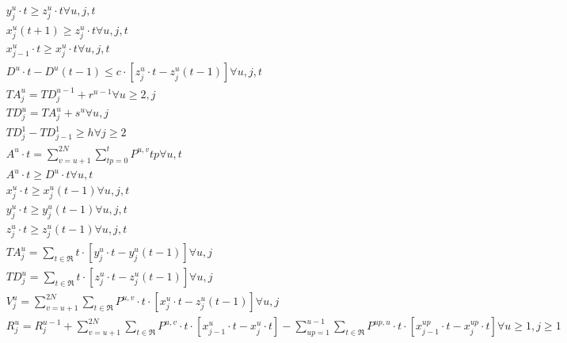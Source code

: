 \begin{align}
  & y_{j}^{u} \cdot t \geq z_{j}^{u} \cdot t \forall u , j , t \tag{eq\_0004} \\
  & x_{j}^{u} \left(t + 1\right) \geq z_{j}^{u} \cdot t \forall u , j , t \tag{eq\_0005} \\
  & x_{j - 1}^{u} \cdot t \geq x_{j}^{u} \cdot t \forall u , j , t \tag{eq\_0006} \\
  & D^{u} \cdot t - D^{u} \left(t - 1\right) \leq c \cdot \left[z_{j}^{u} \cdot t - z_{j}^{u} \left(t - 1\right)\right] \forall u , j , t \tag{eq\_0007} \\
  & \mathit{TA}_{j}^{u} = \mathit{TD}_{j}^{u - 1} + r^{u - 1} \forall u \geq 2 , j \tag{eq\_0010} \\
  & \mathit{TD}_{j}^{u} = \mathit{TA}_{j}^{u} + s^{u} \forall u , j \tag{eq\_0011} \\
  & \mathit{TD}_{j}^{1} - \mathit{TD}_{j - 1}^{1} \geq h \forall j \geq 2 \tag{eq\_0012} \\
  & A^{u} \cdot t = \sum_{v = u + 1}^{2 N} \sum_{tp = 0}^{t} P^{u , v} tp \forall u , t \tag{eq\_0013} \\
  & A^{u} \cdot t \geq D^{u} \cdot t \forall u , t \tag{eq\_0014} \\
  & x_{j}^{u} \cdot t \geq x_{j}^{u} \left(t - 1\right) \forall u , j , t \tag{eq\_0015} \\
  & y_{j}^{u} \cdot t \geq y_{j}^{u} \left(t - 1\right) \forall u , j , t \tag{eq\_0016} \\
  & z_{j}^{u} \cdot t \geq z_{j}^{u} \left(t - 1\right) \forall u , j , t \tag{eq\_0017} \\
  & \mathit{TA}_{j}^{u} = \sum_{t \in \mathfrak{R}} t \cdot \left[y_{j}^{u} \cdot t - y_{j}^{u} \left(t - 1\right)\right] \forall u , j \tag{eq\_0018} \\
  & \mathit{TD}_{j}^{u} = \sum_{t \in \mathfrak{R}} t \cdot \left[z_{j}^{u} \cdot t - z_{j}^{u} \left(t - 1\right)\right] \forall u , j \tag{eq\_0019} \\
  & V_{j}^{u} = \sum_{v = u + 1}^{2 N} \sum_{t \in \mathfrak{R}} P^{u , v} \cdot t \cdot \left[x_{j}^{u} \cdot t - z_{j}^{u} \left(t - 1\right)\right] \forall u , j \tag{eq\_0020} \\
  & R_{j}^{u} = R_{j}^{u - 1} + \sum_{v = u + 1}^{2 N} \sum_{t \in \mathfrak{R}} P^{u , v} \cdot t \cdot \left[x_{j - 1}^{u} \cdot t - x_{j}^{u} \cdot t\right] - \sum_{up = 1}^{u - 1} \sum_{t \in \mathfrak{R}} P^{up , u} \cdot t \cdot \left[x_{j - 1}^{up} \cdot t - x_{j}^{up} \cdot t\right] \forall u \geq 1 , j \geq 1 \tag{eq\_0021\_a} \\

\end{align}
